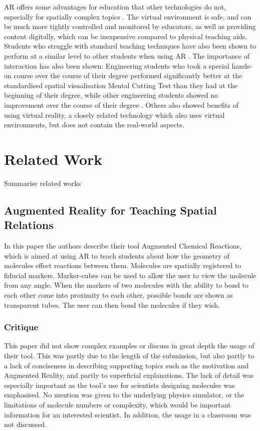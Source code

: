 AR offers some advantages for education that other technologies do not, especially for spatially complex topics \cite{Dunser2006}. The virtual environment is safe, and can be much more tightly controlled and monitored by educators, as well as providing content digitally, which can be inexpensive compared to physical teaching aids. Students who struggle with standard teaching techniques have also been shown to perform at a similar level to other students when using AR \cite{Dunser2008}. The importance of interaction has also been shown: Engineering students who took a special hands-on course over the course of their degree performed significantly better at the standardised spatial visualisation Mental Cutting Test than they had at the beginning of their degree, while other engineering students showed no improvement over the course of their degree \cite{Field99}. Others \cite{Passig2001} also showed benefits of using virtual reality, a closely related technology which also uses virtual environments, but does not contain the real-world aspects.

\section{Related Work}
Summarise related works
\subsection{Augmented Reality for Teaching Spatial Relations}
In this paper\cite{Maier09} the authors describe their tool Augmented Chemical Reactions, which is aimed at using AR to teach students about how the geometry of molecules effect reactions between them. Molecules are spatially registered to fiducial markers. Marker-cubes can be used to allow the user to view the molecule from any angle. When the markers of two molecules with the ability to bond to each other come into proximity to each other, possible bonds are shown as transparent tubes. The user can then bond the molecules if they wish.

\subsubsection{Critique}
This paper did not show complex examples or discuss in great depth the usage of their tool. This was partly due to the length of the submission, but also partly to a lack of conciseness in describing supporting topics such as the motivation and Augmented Reality, and partly to superficial explanations. The lack of detail was especially important as the tool's use for scientists designing molecules was emphasised. No mention was given to the underlying physics simulator, or the limitations of molecule numbers or complexity, which would be important information for an interested scientist. In addition, the usage in a classroom was not discussed.

